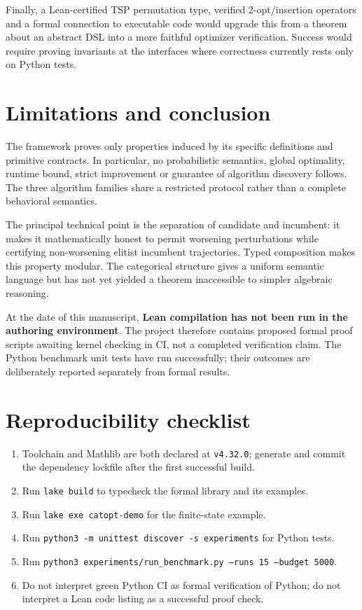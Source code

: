 \documentclass[11pt,a4paper]{article}
\begin{document}
Finally, a Lean-certified TSP permutation type, verified 2-opt/insertion
operators and a formal connection to executable code would upgrade this
from a theorem about an abstract DSL into a more faithful optimizer
verification. Success would require proving invariants at the interfaces
where correctness currently rests only on Python tests.

\section{Limitations and conclusion}
The framework proves only properties induced by its specific definitions
and primitive contracts. In particular, no probabilistic semantics,
global optimality, runtime bound, strict improvement or guarantee of
algorithm discovery follows. The three algorithm families share a
restricted protocol rather than a complete behavioral semantics.

The principal technical point is the separation of candidate and incumbent:
it makes it mathematically honest to permit worsening perturbations while
certifying non-worsening elitist incumbent trajectories. Typed composition
makes this property modular. The categorical structure gives a uniform
semantic language but has not yet yielded a theorem inaccessible to simpler
algebraic reasoning.

At the date of this manuscript, \textbf{Lean compilation has not been run in
the authoring environment}. The project therefore contains proposed
formal proof scripts awaiting kernel checking in CI, not a completed
verification claim. The Python benchmark unit tests have run successfully;
their outcomes are deliberately reported separately from formal results.

\section*{Reproducibility checklist}
\begin{enumerate}[leftmargin=*]
\item Toolchain and Mathlib are both declared at \texttt{v4.32.0}; generate
      and commit the dependency lockfile after the first successful build.
\item Run \texttt{lake build} to typecheck the formal library and its examples.
\item Run \texttt{lake exe catopt-demo} for the finite-state example.
\item Run \texttt{python3 -m unittest discover -s experiments} for Python tests.
\item Run \texttt{python3 experiments/run\_benchmark.py --runs 15 --budget 5000}.
\item Do not interpret green Python CI as formal verification of Python;
      do not interpret a Lean code listing as a successful proof check.
\end{enumerate}
\end{document}
